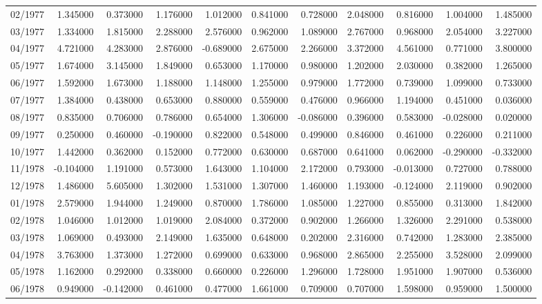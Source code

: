 \begin{tabular}{lrrrrrrrrrr}
02/1977 & 1.345000 & 0.373000 & 1.176000 & 1.012000 & 0.841000 & 0.728000 & 2.048000 & 0.816000 & 1.004000 & 1.485000 \\
03/1977 & 1.334000 & 1.815000 & 2.288000 & 2.576000 & 0.962000 & 1.089000 & 2.767000 & 0.968000 & 2.054000 & 3.227000 \\
04/1977 & 4.721000 & 4.283000 & 2.876000 & -0.689000 & 2.675000 & 2.266000 & 3.372000 & 4.561000 & 0.771000 & 3.800000 \\
05/1977 & 1.674000 & 3.145000 & 1.849000 & 0.653000 & 1.170000 & 0.980000 & 1.202000 & 2.030000 & 0.382000 & 1.265000 \\
06/1977 & 1.592000 & 1.673000 & 1.188000 & 1.148000 & 1.255000 & 0.979000 & 1.772000 & 0.739000 & 1.099000 & 0.733000 \\
07/1977 & 1.384000 & 0.438000 & 0.653000 & 0.880000 & 0.559000 & 0.476000 & 0.966000 & 1.194000 & 0.451000 & 0.036000 \\
08/1977 & 0.835000 & 0.706000 & 0.786000 & 0.654000 & 1.306000 & -0.086000 & 0.396000 & 0.583000 & -0.028000 & 0.020000 \\
09/1977 & 0.250000 & 0.460000 & -0.190000 & 0.822000 & 0.548000 & 0.499000 & 0.846000 & 0.461000 & 0.226000 & 0.211000 \\
10/1977 & 1.442000 & 0.362000 & 0.152000 & 0.772000 & 0.630000 & 0.687000 & 0.641000 & 0.062000 & -0.290000 & -0.332000 \\
11/1978 & -0.104000 & 1.191000 & 0.573000 & 1.643000 & 1.104000 & 2.172000 & 0.793000 & -0.013000 & 0.727000 & 0.788000 \\
12/1978 & 1.486000 & 5.605000 & 1.302000 & 1.531000 & 1.307000 & 1.460000 & 1.193000 & -0.124000 & 2.119000 & 0.902000 \\
01/1978 & 2.579000 & 1.944000 & 1.249000 & 0.870000 & 1.786000 & 1.085000 & 1.227000 & 0.855000 & 0.313000 & 1.842000 \\
02/1978 & 1.046000 & 1.012000 & 1.019000 & 2.084000 & 0.372000 & 0.902000 & 1.266000 & 1.326000 & 2.291000 & 0.538000 \\
03/1978 & 1.069000 & 0.493000 & 2.149000 & 1.635000 & 0.648000 & 0.202000 & 2.316000 & 0.742000 & 1.283000 & 2.385000 \\
04/1978 & 3.763000 & 1.373000 & 1.272000 & 0.699000 & 0.633000 & 0.968000 & 2.865000 & 2.255000 & 3.528000 & 2.099000 \\
05/1978 & 1.162000 & 0.292000 & 0.338000 & 0.660000 & 0.226000 & 1.296000 & 1.728000 & 1.951000 & 1.907000 & 0.536000 \\
06/1978 & 0.949000 & -0.142000 & 0.461000 & 0.477000 & 1.661000 & 0.709000 & 0.707000 & 1.598000 & 0.959000 & 1.500000 \\

\end{tabular}
